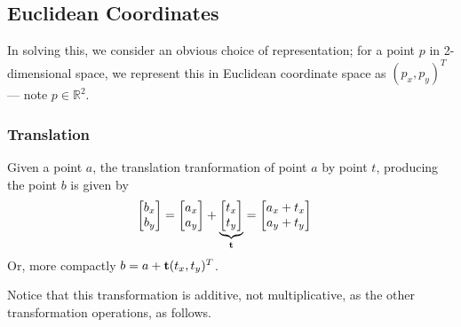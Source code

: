 \documentclass[11pt]{article}
\begin{document}
\subsection{Euclidean Coordinates}
In solving this, we consider an obvious choice of representation; for a point
$p$ in 2-dimensional space, we represent this in Euclidean coordinate space as
$(p_x, p_y)^T$ --- note $p \in \mathbb{R}^2$.

\begin{multicols}{2}
    
    \subsubsection{Translation}
    Given a point $a$, the translation tranformation of point $a$ by point
    $t$, producing the point $b$ is given by
    \small
    \begin{align}
        \begin{bmatrix}
            b_x \\
            b_y
        \end{bmatrix}
        &=
        \begin{bmatrix}
            a_x \\
            a_y
        \end{bmatrix}
        +
        \underbrace{
        \begin{bmatrix}
            t_x \\
            t_y
        \end{bmatrix}}_{\text{\bf t}}
        =
        \begin{bmatrix}
            a_x + t_x \\
            a_y + t_y
        \end{bmatrix}
    \end{align}
    \normalsize
    Or, more compactly $b = a + \text{\bf t}(t_x, t_y)^T$.
    
    Notice that this transformation is additive, not multiplicative, as the
    other transformation operations, as follows.
    

\end{multicols}
\end{document}
